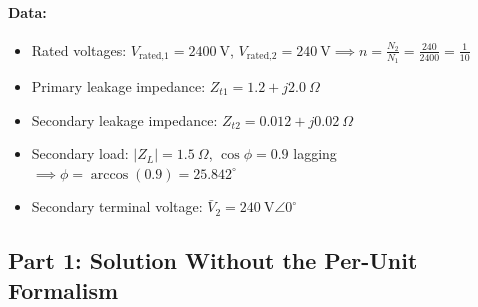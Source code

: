 \paragraph{Data:}
\begin{itemize}
    \item Rated voltages: $V_{\text{rated,1}} = 2400\ \text{V}$, $V_{\text{rated,2}} = 240\ \text{V} \implies n = \frac{N_2}{N_1} = \frac{240}{2400} = \frac{1}{10}$
    \item Primary leakage impedance: $Z_{t1} = 1.2 + j2.0\ \Omega$
    \item Secondary leakage impedance: $Z_{t2} = 0.012 + j0.02\ \Omega$
    \item Secondary load: $|Z_L| = 1.5\ \Omega$, $\cos\phi = 0.9$ lagging $\implies \phi = \arccos(0.9) = 25.842^\circ$
    \item Secondary terminal voltage: $\bar{V}_2 = 240\ \text{V}\angle 0^\circ$
\end{itemize}

\subsection*{Part 1: Solution Without the Per-Unit Formalism}

